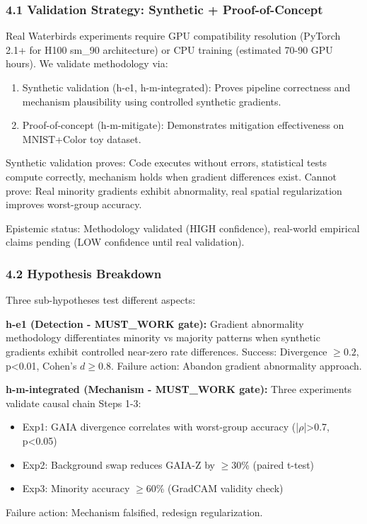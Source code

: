 
\subsubsection{4.1 Validation Strategy: Synthetic + Proof-of-Concept}

Real Waterbirds experiments require GPU compatibility resolution (PyTorch 2.1+ for H100 sm\_90 architecture) or CPU training (estimated 70-90 GPU hours). We validate methodology via:

\begin{enumerate}
\item Synthetic validation (h-e1, h-m-integrated): Proves pipeline correctness and mechanism plausibility using controlled synthetic gradients.
\item Proof-of-concept (h-m-mitigate): Demonstrates mitigation effectiveness on MNIST+Color toy dataset.
\end{enumerate}

Synthetic validation proves: Code executes without errors, statistical tests compute correctly, mechanism holds when gradient differences exist. Cannot prove: Real minority gradients exhibit abnormality, real spatial regularization improves worst-group accuracy.

Epistemic status: Methodology validated (HIGH confidence), real-world empirical claims pending (LOW confidence until real validation).

\subsubsection{4.2 Hypothesis Breakdown}

Three sub-hypotheses test different aspects:

\textbf{h-e1 (Detection - MUST\_WORK gate):} Gradient abnormality methodology differentiates minority vs majority patterns when synthetic gradients exhibit controlled near-zero rate differences. Success: Divergence $\geq 0.2$, p<0.01, Cohen's $d\geq 0.8$. Failure action: Abandon gradient abnormality approach.

\textbf{h-m-integrated (Mechanism - MUST\_WORK gate):} Three experiments validate causal chain Steps 1-3:  
\begin{itemize}
\item Exp1: GAIA divergence correlates with worst-group accuracy (|$\rho$|>0.7, p<0.05)
\item Exp2: Background swap reduces GAIA-Z by $\geq 30$\% (paired t-test)
\item Exp3: Minority accuracy $\geq 60$\% (GradCAM validity check)
\end{itemize}
Failure action: Mechanism falsified, redesign regularization.

